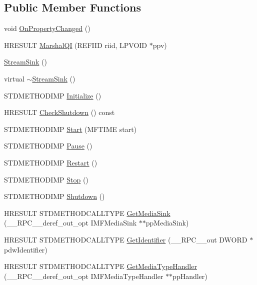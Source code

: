 \subsection*{Public Member Functions}
\begin{DoxyCompactItemize}
\item 
void \hyperlink{class_stream_sink_a4105ab972d1e6059209cafbca68b31cf}{On\+Property\+Changed} ()
\item 
H\+R\+E\+S\+U\+LT \hyperlink{class_stream_sink_a1fc5f971e1425577d406886a92dd3f78}{Marshal\+QI} (R\+E\+F\+I\+ID riid, L\+P\+V\+O\+ID $\ast$ppv)
\item 
\hyperlink{class_stream_sink_a3a87d34c1f8a06e10885e8ac4f7159c4}{Stream\+Sink} ()
\item 
virtual \hyperlink{class_stream_sink_a3ace81ce96b591e7df1b8e4f7dd3d9ed}{$\sim$\+Stream\+Sink} ()
\item 
S\+T\+D\+M\+E\+T\+H\+O\+D\+I\+MP \hyperlink{class_stream_sink_a0bf67b4df06a5d26ba9dde5f0bde68af}{Initialize} ()
\item 
H\+R\+E\+S\+U\+LT \hyperlink{class_stream_sink_ae9d49228e64c14d5bb874dc10a6a6e5e}{Check\+Shutdown} () const
\item 
S\+T\+D\+M\+E\+T\+H\+O\+D\+I\+MP \hyperlink{class_stream_sink_adf97b142152914f7562f56e148a53a23}{Start} (M\+F\+T\+I\+ME start)
\item 
S\+T\+D\+M\+E\+T\+H\+O\+D\+I\+MP \hyperlink{class_stream_sink_a379fddd00072cd2563650493e51b1a1c}{Pause} ()
\item 
S\+T\+D\+M\+E\+T\+H\+O\+D\+I\+MP \hyperlink{class_stream_sink_a602a01d69f1af62b5b373a4c3d68b36f}{Restart} ()
\item 
S\+T\+D\+M\+E\+T\+H\+O\+D\+I\+MP \hyperlink{class_stream_sink_a1219dbe97bbd9728500c01e5bbe12b9b}{Stop} ()
\item 
S\+T\+D\+M\+E\+T\+H\+O\+D\+I\+MP \hyperlink{class_stream_sink_aa87549affd4e84c59a4e6d49df45ef11}{Shutdown} ()
\item 
H\+R\+E\+S\+U\+LT S\+T\+D\+M\+E\+T\+H\+O\+D\+C\+A\+L\+L\+T\+Y\+PE \hyperlink{class_stream_sink_ab896b47cbd002f38ea010400efa580a6}{Get\+Media\+Sink} (\+\_\+\+\_\+\+R\+P\+C\+\_\+\+\_\+deref\+\_\+out\+\_\+opt I\+M\+F\+Media\+Sink $\ast$$\ast$pp\+Media\+Sink)
\item 
H\+R\+E\+S\+U\+LT S\+T\+D\+M\+E\+T\+H\+O\+D\+C\+A\+L\+L\+T\+Y\+PE \hyperlink{class_stream_sink_ac1cb36f22ea8d9d9c3c3c7900b2851cb}{Get\+Identifier} (\+\_\+\+\_\+\+R\+P\+C\+\_\+\+\_\+out D\+W\+O\+RD $\ast$pdw\+Identifier)
\item 
H\+R\+E\+S\+U\+LT S\+T\+D\+M\+E\+T\+H\+O\+D\+C\+A\+L\+L\+T\+Y\+PE \hyperlink{class_stream_sink_ad56edf7f83f6c4ab004476f276cd50a0}{Get\+Media\+Type\+Handler} (\+\_\+\+\_\+\+R\+P\+C\+\_\+\+\_\+deref\+\_\+out\+\_\+opt I\+M\+F\+Media\+Type\+Handler $\ast$$\ast$pp\+Handler)

\end{DoxyCompactItemize}
